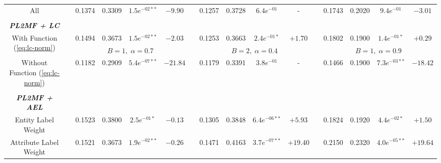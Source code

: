 \begin{table*}
{\begin{tabular}{cc@{\hs}rrccc@{\hs}rrccc@{\hs}rrcc}
{\raggedright All} & \phantom{a} & 0.1374 & 0.3309 & $1.5e^{-02**}$ & $-9.90$
                   & \phantom{a} & 0.1257 & 0.3728 & $6.4e^{-01}$ & -
                   & \phantom{a} & 0.1743 & 0.2020 & $9.4e^{-01}$ & $-3.01$
       \\
\\
\emph{\textbf{PL2MF + LC}} & \multicolumn{15}{c}{\phantom{a}} \\
\multirow{2}{*}{{\raggedright With Function (\ref{eq:lc-norm})}} & \phantom{a} & 0.1494 & 0.3673 & $1.5e^{-02**}$ & $-2.03$
                                                & \phantom{a} & 0.1253 & 0.3663 & $2.4e^{-01*}$ & $+1.70$
                                                & \phantom{a} & 0.1802 & 0.1900 & $1.4e^{-01*}$ & $+0.29$ \\%
 & \phantom{a} & \multicolumn{4}{c}{$B=1,\;\alpha=0.7$}
   & \phantom{a} & \multicolumn{4}{c}{$B=2,\;\alpha=0.4$}
   & \phantom{a} & \multicolumn{4}{c}{$B=1,\;\alpha=0.9$} \\
{\raggedright Without Function (\ref{eq:lc-norm})} & \phantom{a} & 0.1182 & 0.2909 & $5.4e^{-07**}$ & $-21.84$
                                                   & \phantom{a} & 0.1179 & 0.3391 & $3.8e^{-01}$ & -
                                                   & \phantom{a} & 0.1466 & 0.1900 & $7.3e^{-03**}$ & $-18.42$
                                       \\
\\
\emph{\textbf{PL2MF + AEL}} & \multicolumn{15}{c}{\phantom{a}} \\
{\raggedright Entity Label Weight} & \phantom{a} & 0.1523 & 0.3800 & $2.5e^{-01*}$ & $-0.13$
                                   & \phantom{a} & 0.1305 & 0.3848 & $6.4e^{-06**}$ & $+5.93$
                                   & \phantom{a} & 0.1824 & 0.1920 & $4.4e^{-02*}$ & $+1.50$
                       \\
{\raggedright Attribute Label Weight} & \phantom{a} & 0.1521 & 0.3673 & $1.9e^{-02**}$ & $-0.26$
                                      & \phantom{a} & 0.1471 & 0.4163 & $3.7e^{-07**}$ & $+19.40$
                                      & \phantom{a} & 0.2150 & 0.2320 & $4.0e^{-05**}$ & $+19.64$

\end{tabular}}
\end{table*}

